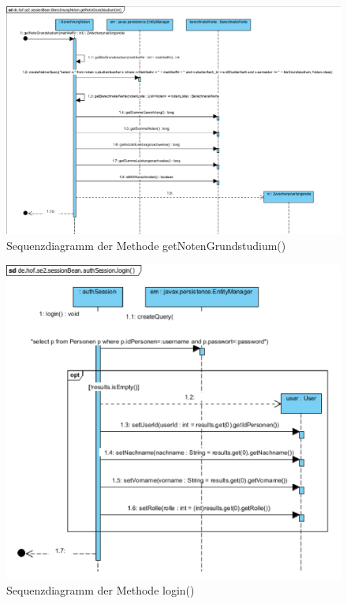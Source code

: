\documentclass[12pt,a4paper,parskip]{scrreprt}
\begin{document}
\begin{figure}[!h]
\centering
\includegraphics[width=0.7\linewidth]{../VP/getNotenGrundstudium}
\caption[Sequenzdiagramm getNotenGrundstudium()]{Sequenzdiagramm der Methode getNotenGrundstudium()}
\label{fig:getNotenGrundstudium}
\end{figure}

\begin{figure}
\centering
\includegraphics[width=0.7\linewidth]{../VP/login}
\caption[Sequenzdiagramm login()]{Sequenzdiagramm der Methode login()}
\label{fig:login}
\end{figure}


\listoffigures
\end{document}
